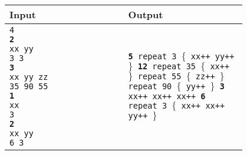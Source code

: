 \begin{table}[h]
    \centering
    \begin{tabular}{|p{0.4\linewidth}|p{0.4\linewidth}|}
        \hline
        Input & Output \\
        \hline
        \texttt{4\newline 
        \textbf{2}\newline 
        xx yy\newline 
        3 3\newline 
        \textbf{3}\newline 
        xx yy zz\newline
        35 90 55\newline
        \textbf{1}\newline 
        xx\newline
        3\newline
        \textbf{2}\newline
        xx yy\newline
        6 3}
        & \texttt{\textbf{5}\newline 
        repeat 3\newline
        $\lbrace$\newline 
        xx++\newline 
        yy++\newline 
        $\rbrace$\newline
        \textbf{12}\newline 
        repeat 35\newline
        $\lbrace$\newline 
        xx++\newline 
        $\rbrace$\newline 
        repeat 55\newline
        $\lbrace$\newline 
        zz++\newline 
        $\rbrace$\newline 
        repeat 90\newline
        $\lbrace$\newline 
        yy++\newline 
        $\rbrace$\newline
        \textbf{3}\newline 
        xx++\newline
        xx++\newline 
        xx++\newline
        \textbf{6}\newline 
        repeat 3\newline 
        $\lbrace$\newline 
        xx++\newline 
        xx++\newline
        yy++\newline
        $\rbrace$\newline} \\
        \hline
    \end{tabular}
\end{table}

